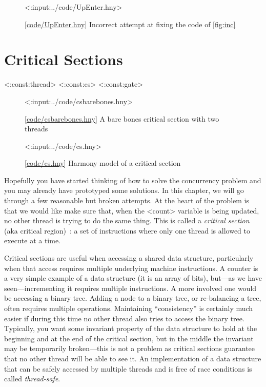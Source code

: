 \documentclass{report}
\newcommand{\harmonylink}[1]{%
[\href{https://harmony.cs.cornell.edu/#1}{\underline{#1}}]%
}
\newenvironment{code}{
\tcolorbox
}{
\endtcolorbox
}
\begin{document}
\begin{figure}
\begin{code}
<{:input:../code/UpEnter.hny}>
\end{code}
\caption{\harmonylink{code/UpEnter.hny} Incorrect attempt at fixing the code of \autoref{fig:inc}}
\label{fig:incenter}
\end{figure}

\chapter{Critical Sections}
\label{ch:critical}

<{:const:thread}>
<{:const:cs}>
<{:const:gate}>

\begin{figure}
\begin{code}
<{:input:../code/csbarebones.hny}>
\end{code}
\caption{\harmonylink{code/csbarebones.hny} A bare bones critical section with two threads}
\label{fig:csbarebones}
\end{figure}

\begin{figure}
\begin{code}
<{:input:../code/cs.hny}>
\end{code}
\caption{\harmonylink{code/cs.hny} Harmony model of a critical section}
\label{fig:cs}
\end{figure}

Hopefully you have started thinking of how to solve the concurrency
problem and you may already have prototyped some solutions.
In this chapter, we will go through a few reasonable but broken attempts.
At the heart of the problem is that we would like make sure that, when
the <{count}> variable is being updated, no other thread is
trying to do the same thing.  This is called a \emph{critical section}
(aka critical region)~\cite{EWD123}:
a set of instructions where only one thread is allowed to execute at a
time.
%
%

%
%

Critical sections are useful when accessing a shared data
structure, particularly when that access requires multiple underlying
machine instructions.  A counter is a very simple example of
a data structure (it is an array of bits), but---as we have
seen---incrementing it requires multiple instructions.
A more involved one would be accessing a binary tree.
Adding a node to a binary tree, or re-balancing a tree, often requires
multiple operations.  Maintaining ``consistency'' is certainly much easier
if during this time no other
thread also tries to access the binary tree.
Typically, you want some invariant property of the data structure to hold
at the beginning and at the end of the critical section, but in the middle
the invariant may be temporarily broken---this is not a problem as critical
sections guarantee that no other
thread will be able to see it.
An implementation of a data structure that can be safely accessed by multiple
threads and is free of race conditions is called \emph{thread-safe}.
%
%
\end{document}
